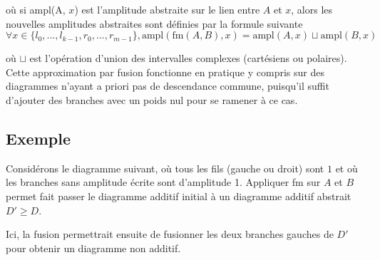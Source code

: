 où si ampl(A, $x$) est l'amplitude abstraite sur le lien entre $A$ et $x$, alors les nouvelles amplitudes abstraites sont définies par la formule suivante
$$\forall x \in \{l_0, ..., l_{k-1}, r_0, ..., r_{m-1}\}, \text{ampl}(\text{fm}(A, B), x) = \text{ampl}(A, x) \sqcup \text{ampl}(B, x)$$

\noindent où $\sqcup$ est l'opération d'union des intervalles complexes (cartésiens ou polaires). Cette approximation par fusion fonctionne en pratique y compris sur des diagrammes n'ayant a priori pas de descendance commune, puisqu'il suffit d'ajouter des branches avec un poids nul pour se ramener à ce cas.


\begin{multicols}{2}
  \section{Exemple}
  Considérons le diagramme suivant, où tous les fils (gauche ou droit) sont $\boxed 1$ et où les branches sans amplitude écrite sont d'amplitude 1. Appliquer fm sur $A$ et $B$ permet fait passer le diagramme additif initial à un diagramme additif abstrait $D' \ge D$.

  Ici, la fusion permettrait ensuite de fusionner les deux branches gauches de $D'$ pour obtenir un diagramme non additif.


\end{multicols}
